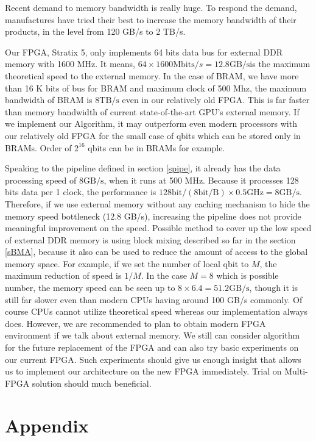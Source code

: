 \documentclass[a4paper]{article}
\begin{document}
Recent demand to memory bandwidth is really huge. To respond the demand, manufactures have tried their best to increase the memory bandwidth of their products, in the level from 120 GB/s to 2 TB/s.

Our FPGA, Stratix 5, only implements 64 bits data bus for external DDR memory with 1600 MHz. It means, \(64\times 1600 \mathrm{Mbits}/s = 12.8 \mathrm{GB/s}\)is the maximum theoretical speed to the external memory. In the case of BRAM, we have more than 16 K bits of bus for BRAM and maximum clock of 500 Mhz, the maximum bandwidth of BRAM is \(8 \mathrm{TB/s}\) even in our relatively old FPGA. This is far faster than memory bandwidth of current state-of-the-art GPU's external memory. If we implement our Algorithm, it may outperform even modern processors with our relatively old FPGA for the small case of qbits which can be stored only in BRAMs. Order of \(2^{16}\) qbits can be in BRAMs for example.

Speaking to the pipeline defined in section \ref{spipe}, it already has the data processing speed of \(8 \mathrm{GB/s}\), when it runs at 500 MHz. Because it processes 128 bits data per 1 clock, the performance is \(128 \mathrm{bit}/ (8 \mathrm{bit/B}) \times 0.5 \mathrm{GHz} = 8 \mathrm{GB/s}\). Therefore, if we use external memory without any caching mechanism to hide the memory speed bottleneck (12.8 GB/s), increasing the pipeline does not provide meaningful improvement on the speed. Possible method to cover up the low speed of external DDR memory is using block mixing described so far in the section \ref{sBMA}, because it also can be used to reduce the amount of access to the global memory space. For example, if we set the number of local qbit to \(M\), the maximum reduction of speed is \(1/M\). In the case \(M=8\) which is possible number, the memory speed can be seen up to \(8\times 6.4 = 51.2 \mathrm{GB/s}\), though it is still far slower even than modern CPUs having around 100 GB/s commonly. Of course CPUs cannot utilize theoretical speed whereas our implementation always does. However, we are recommended to plan to obtain modern FPGA environment if we talk about external memory. We still can consider algorithm for the future replacement of the FPGA and can also try basic experiments on our current FPGA. Such experiments should give us enough insight that allows us to implement our architecture on the new FPGA immediately. Trial on Multi-FPGA solution should much beneficial.

\section{Appendix}
\end{document}
